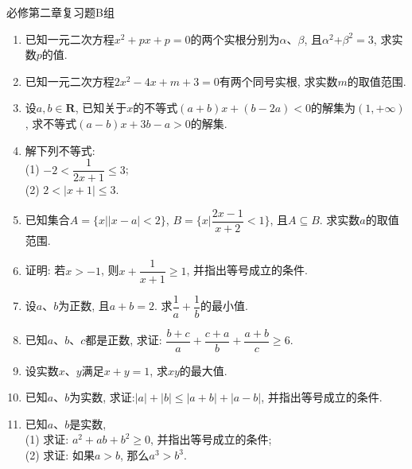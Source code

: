 \documentclass[10pt,a4paper]{article}
\begin{document}
必修第二章复习题B组
\begin{enumerate}[1.]

\item 已知一元二次方程$x^2+px+p=0$的两个实根分别为$\alpha$、$\beta$, 且$\alpha^2$+$\beta^2=3$, 求实数$p$的值.
\vspace*{3cm}
\item 已知一元二次方程$2x^2-4x+m+3=0$有两个同号实根, 求实数$m$的取值范围.
\vspace*{3cm}
\item 设$a,b\in \mathbf{R}$, 已知关于$x$的不等式$(a+b)x+(b-2a)<0$的解集为$(1, +\infty)$, 求不等式$(a-b)x+3b-a>0$的解集.
\vspace*{3cm}
\item 解下列不等式:\\
(1) $-2< \dfrac 1{2x+1}\le 3$;\\
(2) $2<|x+1|\le 3$.
\vspace*{3cm}
\item 已知集合$A=\{x||x-a|<2\}$, $B=\{x|\dfrac{2x-1}{x+2}<1\}$, 且$A\subseteq B$. 求实数$a$的取值范围.
\vspace*{3cm}
\item 证明: 若$x>-1$, 则$x+\dfrac 1{x+1}\ge 1$, 并指出等号成立的条件.
\vspace*{3cm}
\item 设$a$、$b$为正数, 且$a+b=2$. 求$\dfrac 1a+\dfrac 1b$的最小值.
\vspace*{3cm}
\item 已知$a$、$b$、$c$都是正数, 求证: $\dfrac{b+c}{a}+\dfrac{c+a}{b}+\dfrac{a+b}{c}\ge 6$.
\vspace*{3cm}
\item 设实数$x$、$y$满足$x+y=1$, 求$xy$的最大值.
\vspace*{3cm}
\item 已知$a$、$b$为实数, 求证:$|a|+|b| \le |a+b| +|a-b|$, 并指出等号成立的条件.
\vspace*{3cm}
\item 已知$a$、$b$是实数,\\
(1) 求证: $a^2+ab+b^2\ge 0$, 并指出等号成立的条件;\\
(2) 求证: 如果$a>b$, 那么$a^3>b^3$. 
\vspace*{3cm}
\end{enumerate}
\end{document}
